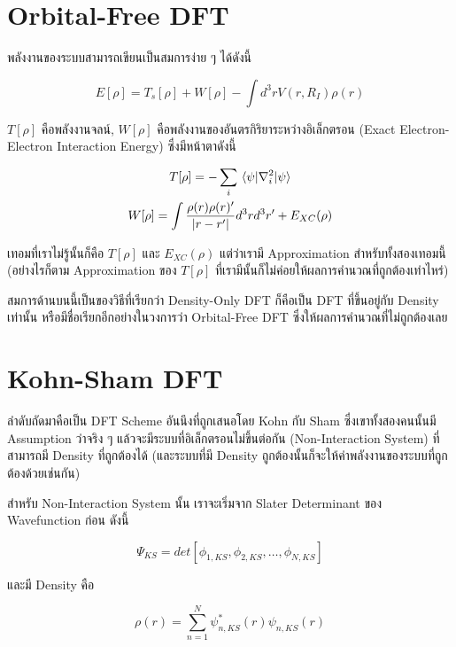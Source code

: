 \section{Orbital-Free DFT}

พลังงานของระบบสามารถเขียนเป็นสมการง่าย ๆ ได้ดังนี้

\begin{equation}
    E[\rho] = T_{s}[\rho] + W[\rho] - \int d^{3} r V(r,R_{I}) \rho(r)
\end{equation}

\noindent $T[\rho]$ คือพลังงานจลน์, $W[\rho]$ คือพลังงานของอันตรกิริยาระหว่างอิเล็กตรอน
(Exact Electron-Electron Interaction Energy) ซึ่งมีหน้าตาดังนี้

\begin{gather}
    T[\rho] = -\sum_{i} \mel{\psi}{\nabla^{2}_{i}}{\psi} \\
    W[\rho] = \int \frac{\rho(r)\rho(r)'}{|r-r'|} d^{3} r d^{3} r' + E_{XC}(\rho)
\end{gather}

เทอมที่เราไม่รู้นั้นก็คือ $T[\rho]$ และ  $E_{XC}(\rho)$ แต่ว่าเรามี Approximation สำหรับทั้งสองเทอมนี้
(อย่างไรก็ตาม Approximation ของ $T[\rho]$ ที่เรามีนั้นก็ไม่ค่อยให้ผลการคำนวณที่ถูกต้องเท่าไหร่)

สมการด้านบนนี้เป็นของวิธีที่เรียกว่า Density-Only DFT ก็คือเป็น DFT ที่ขึ้นอยู่กับ Density เท่านั้น
หรือมีชื่อเรียกอีกอย่างในวงการว่า Orbital-Free DFT ซึ่งให้ผลการคำนวณที่ไม่ถูกต้องเลย

\section{Kohn-Sham DFT}

ลำดับถัดมาคือเป็น DFT Scheme อันนึงที่ถูกเสนอโดย Kohn กับ Sham ซึ่งเขาทั้งสองคนนั้นมี Assumption
ว่าจริง ๆ แล้วจะมีระบบที่อิเล็กตรอนไม่ขึ้นต่อกัน (Non-Interaction System) ที่สามารถมี Density
ที่ถูกต้องได้ (และระบบที่มี Density ถูกต้องนั้นก็จะให้ค่าพลังงานของระบบที่ถูกต้องด้วยเช่นกัน)

สำหรับ Non-Interaction System นั้น เราจะเริ่มจาก Slater Determinant ของ Wavefunction
ก่อน ดังนี้

\begin{equation}
    \Psi_{KS} = det[\phi_{1,KS}, \phi_{2,KS}, \dots, \phi_{N,KS}]
\end{equation}

\noindent และมี Density คือ

\begin{equation}
    \rho(r) = \sum^{N}_{n=1} \psi_{n,KS}^{\ast}(r) \psi_{n,KS}(r)
\end{equation}

